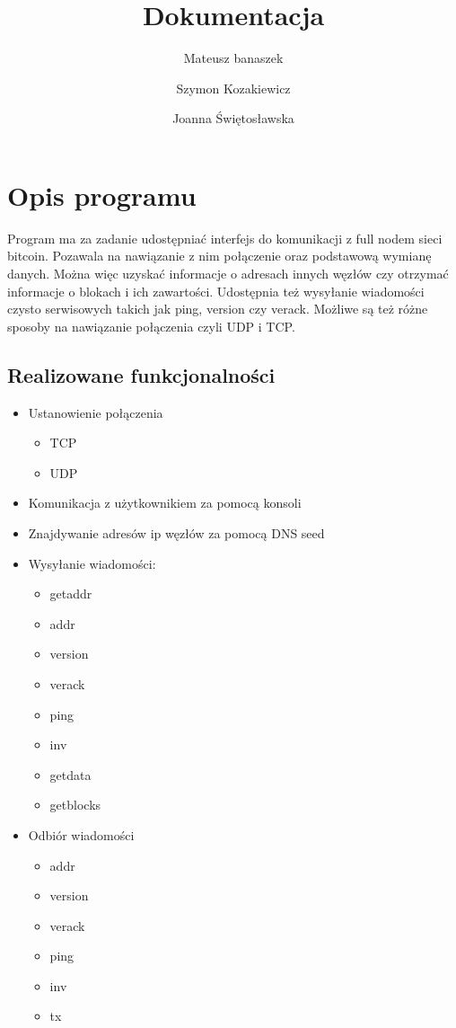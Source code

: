 

\title{Dokumentacja}
\author{Mateusz banaszek \and Szymon Kozakiewicz \and Joanna Świętosławska}

\maketitle
\tableofcontents
\section{Opis programu}
Program ma za zadanie udostępniać interfejs do komunikacji z full nodem sieci bitcoin. Pozawala na nawiązanie z nim połączenie oraz podstawową wymianę danych. Można więc uzyskać informacje o adresach innych węzłów czy otrzymać informacje o blokach i ich zawartości. Udostępnia też wysyłanie wiadomości czysto serwisowych takich jak ping, version czy verack. Możliwe są też różne sposoby na nawiązanie połączenia czyli UDP i TCP. 

\subsection{Realizowane funkcjonalności}

\begin{itemize}


\item Ustanowienie połączenia
\begin{itemize}
\item TCP
\item UDP
\end{itemize}

\item Komunikacja z użytkownikiem za pomocą konsoli
\item Znajdywanie adresów ip węzłów za pomocą DNS seed
\item Wysyłanie wiadomości:
\begin{itemize}
\item getaddr
\item addr
\item version
\item verack
\item ping
\item inv
\item getdata
\item getblocks
\end{itemize} 
\item Odbiór wiadomości
\begin{itemize}
\item addr
\item version
\item verack
\item ping
\item inv
\item tx

\end{itemize}
\end{itemize}

